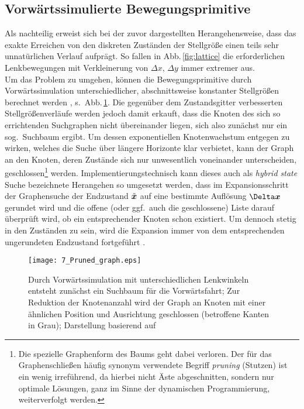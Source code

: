 {\subsection{Vorwärtssimulierte Bewegungsprimitive}
Als nachteilig erweist sich bei der zuvor dargestellten Herangehensweise, dass das exakte Erreichen von den diskreten Zuständen der Stellgröße einen teils sehr unnatürlichen Verlauf aufprägt. So fallen in Abb.\,\ref{fig:lattice} die erforderlichen Lenkbewegungen mit Verkleinerung von $\Delta x$, $\Delta y$ immer extremer aus. \\
Um das Problem zu umgehen, können die Bewegungsprimitive durch Vorwärtssimulation unterschiedlicher, abschnittsweise konstanter Stellgrößen berechnet werden \cite{zieglerIV08, dolgov2010path}, s.\ Abb.\,\ref{fig:pruning}. Die gegenüber dem Zustandsgitter verbesserten Stellgrößenverläufe werden jedoch damit erkauft, dass die Knoten des sich so errichtenden Suchgraphen \iA nicht übereinander liegen, sich also zunächst nur ein sog.\ Suchbaum ergibt. Um dessen exponentiellen Knotenwachstum entgegen zu wirken, welches die Suche über längere Horizonte klar verbietet, kann der Graph an den Knoten, deren Zustände sich nur unwesentlich voneinander unterscheiden, geschlossen\footnote{Die spezielle Graphenform des Baums geht dabei verloren. Der für das Graphenschließen häufig synonym verwendete Begriff \emph{pruning} (Stutzen) \cite{dolgov2010path} ist ein wenig irreführend, da hierbei nicht Äste abgeschnitten, sondern nur optimale Lösungen, ganz im Sinne der dynamischen Programmierung, weiterverfolgt werden.} werden. Implementierungstechnisch kann dieses auch als \emph{hybrid state} Suche \cite{dolgov2010path} bezeichnete Herangehen so umgesetzt werden, dass im Expansionsschritt der Graphensuche der Endzustand $\tilde{\boldsymbol{x}}$ auf eine bestimmte Auflösung  $\Delta \bs x$  gerundet wird und die offene (oder ggf.\ auch die geschlossene) Liste darauf überprüft wird, ob ein entsprechender Knoten schon existiert. Um dennoch stetig in den Zuständen zu sein, wird die Expansion immer von dem entsprechenden ungerundeten Endzustand fortgeführt \cite{dolgov2010path}. \\ 

\begin{figure}[h]
\centering
 \texttt{[image: 7\_Pruned\_graph.eps]}
	\caption[Suchbaum für die Vorwärtsfahrt]{Durch Vorwärtssimulation mit unterschiedlichen Lenkwinkeln entsteht zunächst ein Suchbaum für die Vorwärtsfahrt; Zur Reduktion der Knotenanzahl wird der Graph an Knoten mit einer ähnlichen Position und Ausrichtung geschlossen (betroffene Kanten in Grau); Darstellung basierend auf \cite{Stangl2013}}
	\label{fig:pruning}
\end{figure} 

}
